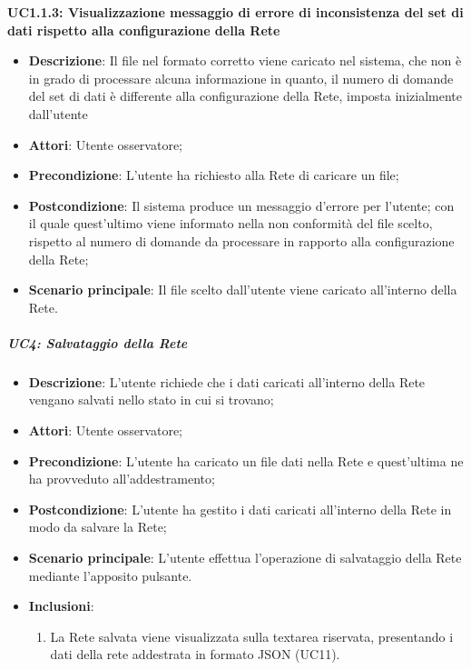 \textbf{UC1.1.3: Visualizzazione messaggio di errore di inconsistenza del set di dati rispetto alla configurazione della Rete}\mbox{}
\label{UC1.1.3: Visualizzazione messaggio di errore di inconsistenza del set di dati rispetto alla configurazione della Rete}
\begin{itemize}
\item \textbf{Descrizione}: Il file nel formato corretto viene caricato nel sistema, che non \`e in grado di processare alcuna informazione in quanto, il numero di domande del set di dati \`e differente alla configurazione della Rete, imposta inizialmente dall'utente
\item \textbf{Attori}: Utente osservatore;
\item \textbf{Precondizione}: L'utente ha richiesto alla Rete di caricare un file;
\item \textbf{Postcondizione}: Il sistema produce un messaggio d'errore per l'utente; con il quale quest'ultimo viene informato nella non conformit\`a del file scelto, rispetto al numero di domande da processare in rapporto alla configurazione della Rete;
\item \textbf{Scenario principale}: Il file scelto dall'utente viene caricato all'interno della Rete.
\end{itemize}
 
 
\subparagraph{UC4: Salvataggio della Rete}\mbox{} 
\label{UC4: Salvataggio della Rete}
\noindent
\begin{itemize}
\item \textbf{Descrizione}: L'utente richiede che i dati caricati all'interno della Rete vengano salvati nello stato in cui si trovano;
\item \textbf{Attori}: Utente osservatore;
\item \textbf{Precondizione}: L'utente ha caricato un file dati nella Rete e quest'ultima ne ha provveduto all'addestramento;
\item \textbf{Postcondizione}: L'utente ha gestito i dati caricati all'interno della Rete in modo da salvare la Rete;
\item \textbf{Scenario principale}: L'utente effettua l'operazione di salvataggio della Rete mediante l'apposito pulsante.
\item \textbf{Inclusioni}:
\begin{enumerate}
\item La Rete salvata viene visualizzata sulla textarea riservata, presentando i dati della rete addestrata in formato JSON (UC11).
\end{enumerate}
\end{itemize}


